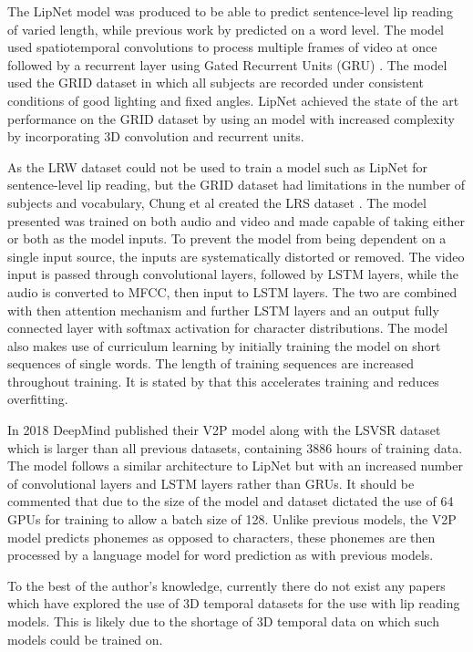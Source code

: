 \documentclass[12pt]{article}
\begin{document}
The LipNet model \cite{Assael2016} was produced to be able to predict sentence-level lip reading of varied length, while previous work by \cite{Chung2016} predicted on a word level.
The model used spatiotemporal convolutions to process multiple frames of video at once followed by a recurrent layer using Gated Recurrent Units (GRU) \cite{Cho2014}.
The model used the GRID dataset \cite{Cooke2006} in which all subjects are recorded under consistent conditions of good lighting and fixed angles.
LipNet achieved the state of the art performance on the GRID dataset by using an model with increased complexity by incorporating 3D convolution and recurrent units.

As the LRW dataset could not be used to train a model such as LipNet for sentence-level lip reading, but the GRID dataset had limitations in the number of subjects and vocabulary, Chung et al created the LRS dataset \cite{Chung2017}.
The model presented was trained on both audio and video and made capable of taking either or both as the model inputs.
To prevent the model from being dependent on a single input source, the inputs are systematically distorted or removed.
The video input is passed through convolutional layers, followed by LSTM layers, while the audio is converted to MFCC, then input to LSTM layers.
The two are combined with then attention mechanism and further LSTM layers and an output fully connected layer with softmax activation for character distributions.
The model also makes use of curriculum learning by initially training the model on short sequences of single words.
The length of training sequences are increased throughout training.
It is stated by \cite{Chung2017} that this accelerates training and reduces overfitting.

In 2018 DeepMind published their V2P model \cite{Shillingford2018} along with the LSVSR dataset which is larger than all previous datasets, containing 3886 hours of training data.
The model follows a similar architecture to LipNet \cite{Assael2016} but with an increased number of convolutional layers and LSTM layers rather than GRUs.
It should be commented that due to the size of the model and dataset dictated the use of 64 GPUs for training to allow a batch size of 128.
Unlike previous models, the V2P model predicts phonemes as opposed to characters, these phonemes are then processed by a language model for word prediction as with previous models.

To the best of the author's knowledge, currently there do not exist any papers which have explored the use of 3D temporal datasets for the use with lip reading models. 
This is likely due to the shortage of 3D temporal data on which such models could be trained on.
\end{document}
